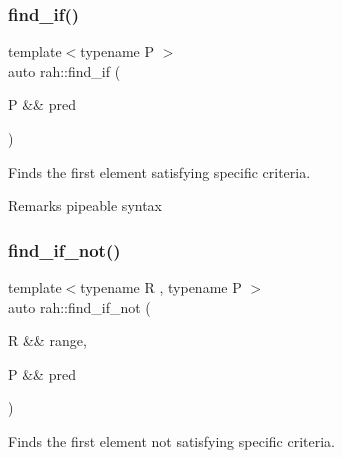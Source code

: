 \subsubsection{\texorpdfstring{find\_if()}{find\_if()}\hspace{0.1cm}{\footnotesize\ttfamily [2/2]}}
{\footnotesize\ttfamily template$<$typename P $>$ \\
auto rah\+::find\+\_\+if (\begin{DoxyParamCaption}\item[{P \&\&}]{pred }\end{DoxyParamCaption})}



Finds the first element satisfying specific criteria. 

\begin{DoxyRemark}{Remarks}
pipeable syntax
\end{DoxyRemark}

\begin{DoxyCodeInclude}{0}
\DoxyCodeLine{        );}
\end{DoxyCodeInclude}
\mbox{\label{namespacerah_af758ef3c67d20ba6260319cb0e0171c5}} 
\subsubsection{\texorpdfstring{find\_if\_not()}{find\_if\_not()}\hspace{0.1cm}{\footnotesize\ttfamily [1/2]}}
{\footnotesize\ttfamily template$<$typename R , typename P $>$ \\
auto rah\+::find\+\_\+if\+\_\+not (\begin{DoxyParamCaption}\item[{R \&\&}]{range,  }\item[{P \&\&}]{pred }\end{DoxyParamCaption})}



Finds the first element not satisfying specific criteria. 


